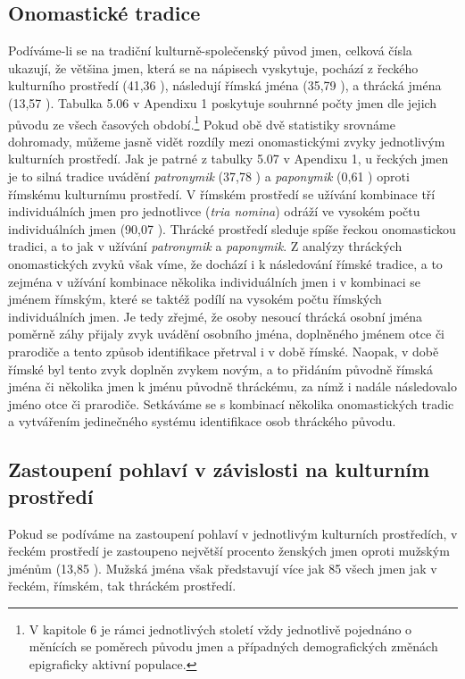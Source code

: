 \subsection[onomastické-tradice]{Onomastické tradice}

Podíváme-li se na tradiční kulturně-společenský původ jmen, celková čísla ukazují, že většina jmen, která se na nápisech vyskytuje, pochází z řeckého kulturního prostředí (41,36 ), následují římská jména (35,79 ), a thrácká jména (13,57 ). Tabulka 5.06 v Apendixu 1 poskytuje souhrnné počty jmen dle jejich původu ze všech časových období.\footnote{V kapitole 6 je rámci jednotlivých století vždy jednotlivě pojednáno o měnících se poměrech původu jmen a případných demografických změnách epigraficky aktivní populace.} Pokud obě dvě statistiky srovnáme dohromady, můžeme jasně vidět rozdíly mezi onomastickými zvyky jednotlivým kulturních prostředí. Jak je patrné z tabulky 5.07 v Apendixu 1, u řeckých jmen je to silná tradice uvádění {\em patronymik} (37,78 ) a {\em paponymik} (0,61 ) oproti římskému kulturnímu prostředí. V římském prostředí se užívání kombinace tří individuálních jmen pro jednotlivce ({\em tria nomina}) odráží ve vysokém počtu individuálních jmen (90,07 ). Thrácké prostředí sleduje spíše řeckou onomastickou tradici, a to jak v užívání {\em patronymik} a {\em paponymik}. Z analýzy thráckých onomastických zvyků však víme, že dochází i k následování římské tradice, a to zejména v užívání kombinace několika individuálních jmen i v kombinaci se jménem římským, které se taktéž podílí na vysokém počtu římských individuálních jmen. Je tedy zřejmé, že osoby nesoucí thrácká osobní jména poměrně záhy přijaly zvyk uvádění osobního jména, doplněného jménem otce či prarodiče a tento způsob identifikace přetrval i v době římské. Naopak, v době římské byl tento zvyk doplněn zvykem novým, a to přidáním původně římská jména či několika jmen k jménu původně thráckému, za nímž i nadále následovalo jméno otce či prarodiče. Setkáváme se s kombinací několika onomastických tradic a vytvářením jedinečného systému identifikace osob thráckého původu.

\subsection[zastoupení-pohlaví-v-závislosti-na-kulturním-prostředí]{Zastoupení pohlaví v závislosti na kulturním prostředí}

Pokud se podíváme na zastoupení pohlaví v jednotlivým kulturních prostředích, v řeckém prostředí je zastoupeno největší procento ženských jmen oproti mužským jménům (13,85 ). Mužská jména však představují více jak 85  všech jmen jak v řeckém, římském, tak thráckém prostředí.

